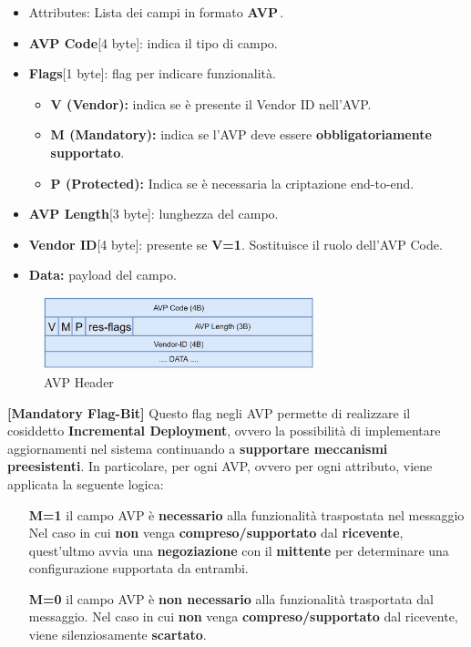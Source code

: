 \begin{itemize}
    \item Attributes: Lista dei campi in formato \textbf{AVP}\footnotemark\,.
\end{itemize}
\begin{definition}
\begin{itemize}
    \item \textbf{AVP Code}[4 byte]: indica il tipo di campo.
    \item \textbf{Flags}[1 byte]: flag per indicare funzionalità.
    \begin{itemize}
        \item \textbf{V (Vendor):} indica se è presente il Vendor ID nell'AVP.
        \item \textbf{M (Mandatory):} indica se l'AVP deve essere \textbf{obbligatoriamente supportato}.
        \item \textbf{P (Protected):} Indica se è necessaria la criptazione end-to-end.
    \end{itemize}
    \item \textbf{AVP Length}[3 byte]: lunghezza del campo.
    \item \textbf{Vendor ID}[4 byte]: presente se \textbf{V=1}. Sostituisce il ruolo dell'AVP Code.
    \item \textbf{Data:} payload del campo.
\end{itemize}
\end{definition}
\begin{figure}[ht]
    \centering
    \includegraphics[width=0.7\textwidth]{image/avpheader.png}
    \caption{AVP Header}
    \label{fig:avpheader}
\end{figure}
\begin{remark}\textbf{[Mandatory Flag-Bit]}
Questo flag negli AVP permette di realizzare il cosiddetto \textbf{Incremental Deployment}, ovvero la possibilità di implementare aggiornamenti nel sistema continuando a \textbf{supportare meccanismi preesistenti}. In particolare, per ogni AVP, ovvero per ogni attributo, viene applicata la seguente logica:
\begin{itemize}
    \item [\textbf{M=1}] il campo AVP è \textbf{necessario} alla funzionalità traspostata nel messaggio Nel caso in cui \textbf{non} venga \textbf{compreso/supportato} dal \textbf{ricevente}, quest'ultmo avvia una \textbf{negoziazione} con il \textbf{mittente} per determinare una configurazione supportata da entrambi.
    \item [\textbf{M=0}] il campo AVP è \textbf{non necessario} alla funzionalità trasportata dal messaggio. Nel caso in cui \textbf{non} venga \textbf{compreso/supportato} dal ricevente, viene silenziosamente \textbf{scartato}.
\end{itemize}
\end{remark}
